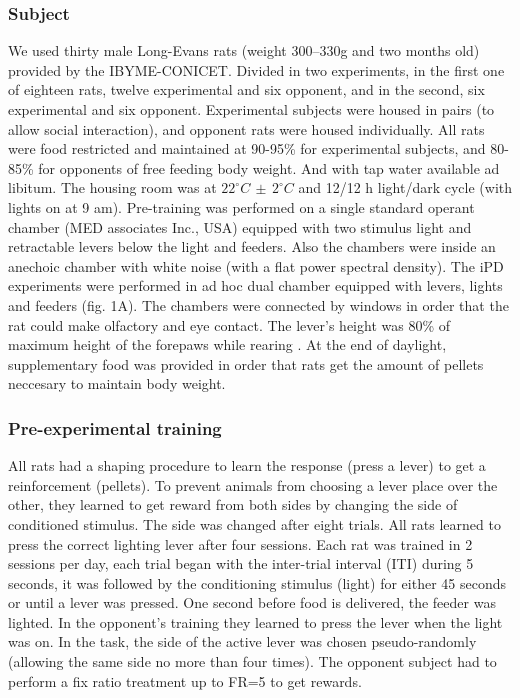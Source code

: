 \documentclass[10pt,letterpaper]{article}
\begin{document}
\subsubsection*{Subject} 
We used thirty male Long-Evans rats (weight 300–330g and two months old) provided by the IBYME-CONICET. Divided in two experiments, in the first one of eighteen rats, twelve experimental and six opponent, and in the second, six experimental and six opponent. Experimental subjects were housed in pairs (to allow social interaction), and opponent rats were housed individually. All rats were food restricted and maintained at 90-95\% for experimental subjects, and 80-85\% for opponents of free feeding body weight. And with tap water available ad libitum. The housing room was at $22^\circ C\,\pm\,2^\circ C$ and 12/12 h light/dark cycle (with lights on at 9 am). Pre-training was performed on a single standard operant chamber (MED associates Inc., USA) equipped with two stimulus light and retractable levers below the light and feeders. Also the chambers were inside an anechoic chamber with white noise (with a flat power spectral density).
The iPD experiments were performed in ad hoc dual chamber equipped with levers, lights and feeders (fig. 1A). The chambers were connected by windows in order that the rat could make olfactory and eye contact. The lever's height was 80\% of maximum height of the forepaws while rearing \cite{cabrera2013affordance}. At the end of daylight, supplementary food was provided in order that rats get the amount of pellets neccesary to maintain body weight.

\subsubsection*{Pre-experimental training}
All rats had a shaping procedure to learn the response (press a lever) to get a reinforcement (pellets). To prevent animals from choosing a lever place over the other, they learned to get reward from both sides by changing the side of conditioned stimulus. The side was changed after eight trials. All rats learned to press the correct lighting lever after four sessions. Each rat was trained in 2 sessions per day, each trial began with the inter-trial interval (ITI) during 5 seconds, it was followed by the conditioning stimulus (light) for either 45 seconds or until a lever was pressed. One second before food is delivered, the feeder was lighted. In the opponent's training they learned to press the lever when the light was on. In the task, the side of the active lever was chosen pseudo-randomly (allowing the same side no more than four times). The opponent subject had to perform a fix ratio treatment up to FR=5 to get rewards.
\end{document}
